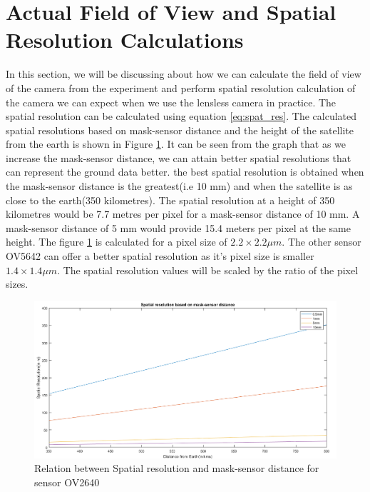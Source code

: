 \section{Actual Field of View and Spatial Resolution Calculations}
In this section, we will be discussing about how we can calculate the field of view of the camera from the experiment and perform spatial resolution calculation of the camera we can expect when we use the lensless camera in practice. The spatial resolution can be calculated using equation \ref{eq:spat_res}. The calculated spatial resolutions based on mask-sensor distance and the height of the satellite from the earth is shown in Figure \ref{fig:spat-res-graph-1}. It can be seen from the graph that as we increase the mask-sensor distance, we can attain better spatial resolutions that can represent the ground data better. the best spatial resolution is obtained when the mask-sensor distance is the greatest(i.e 10 mm) and when the satellite is as close to the earth(350 kilometres). The spatial resolution at a height of 350 kilometres would be 7.7 metres per pixel for a mask-sensor distance of 10 mm. A mask-sensor distance of 5 mm would provide 15.4 meters per pixel at the same height. The figure \ref{fig:spat-res-graph-1} is calculated for a pixel size of $2.2 \times 2.2 \mu m$. The other sensor OV5642 can offer a better spatial resolution as it's pixel size is smaller $1.4 \times 1.4 \mu m$. The spatial resolution values will be scaled by the ratio of the pixel sizes. 

\begin{figure}[]
\centering
\includegraphics[width = \linewidth]{pics/spatial-res-calc}
\caption{Relation between Spatial resolution and mask-sensor distance for sensor OV2640}
\label{fig:spat-res-graph-1}
\end{figure}

